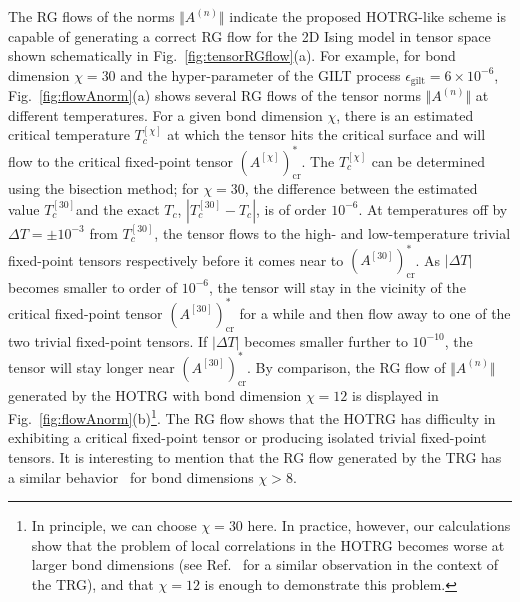 \documentclass[aps,prr,reprint,superscriptaddress,nofootinbib,floatfix]{revtex4-2}
\begin{document}
The RG flows of the norms $\Vert A^{(n)} \Vert$ indicate the proposed HOTRG-like scheme is capable of generating a correct RG flow for the 2D Ising model in tensor space shown schematically in Fig.~\ref{fig:tensorRGflow}(a). 
For example, for bond dimension $\chi = 30$ and the hyper-parameter of the GILT process $\epsilon_{\text{gilt}} = 6\times 10^{-6}$, Fig.~\ref{fig:flowAnorm}(a) shows several RG flows of the tensor norms $\Vert A^{(n)} \Vert$ at different temperatures. 
For a given bond dimension $\chi$, there is an estimated critical temperature $T_c^{[\chi]}$ at which the tensor hits the critical surface and will flow to the critical fixed-point tensor $(A^{[\chi]})^*_{\text{cr}}$. 
The $T_c^{[\chi]}$ can be determined using the bisection method; for $\chi = 30$, the difference between the estimated value $T_c^{[30]}$and the exact $T_c$, $|T_c^{[30]} - T_c|$, is of order $10^{-6}$. 
At temperatures off by $\Delta T = \pm 10^{-3}$ from $T_c^{[30]}$, the tensor flows to the high- and low-temperature trivial fixed-point tensors respectively before it comes near to $(A^{[30]})^*_{\text{cr}}$. 
As $|\Delta T|$ becomes smaller to order of $10^{-6}$, the tensor will stay in the vicinity of the critical fixed-point tensor $(A^{[30]})^*_{\text{cr}}$ for a while and then flow away to one of the two trivial fixed-point tensors. 
If $|\Delta T|$ becomes smaller further to $10^{-10}$, the tensor will stay longer near $(A^{[30]})^*_{\text{cr}}$. 
By comparison, the RG flow of $\Vert A^{(n)}\Vert$ generated by the HOTRG with bond dimension $\chi = 12$ is displayed in Fig.~\ref{fig:flowAnorm}(b)\footnote{
    In principle, we can choose $\chi = 30$ here. 
    In practice, however, our calculations show that the problem of local correlations in the HOTRG becomes worse at larger bond dimensions (see Ref.~\cite{Berker2008} for a similar observation in the context of the TRG), and that $\chi = 12$ is enough to demonstrate this problem.
}. 
The RG flow shows that the HOTRG has difficulty in exhibiting a critical fixed-point tensor or producing isolated trivial fixed-point tensors. 
It is interesting to mention that the RG flow generated by the TRG has a similar behavior~\cite{Berker2008} for bond dimensions $\chi > 8$.
%
\end{document}
